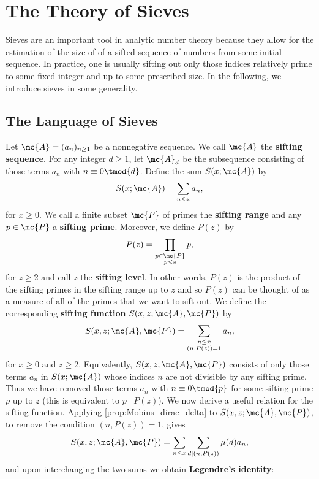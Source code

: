 \chapter{The Theory of Sieves}
  Sieves are an important tool in analytic number theory because they allow for the estimation of the size of of a sifted sequence of numbers from some initial sequence. In practice, one is usually sifting out only those indices relatively prime to some fixed integer and up to some prescribed size. In the following, we introduce sieves in some generality.
  \section{The Language of Sieves}
    Let $\mc{A} = (a_{n})_{n \ge 1}$ be a nonnegative sequence. We call $\mc{A}$ the \textbf{sifting sequence}. For any integer $d \ge 1$, let $\mc{A}_{d}$ be the subsequence consisting of those terms $a_{n}$ with $n \equiv 0 \tmod{d}$. Define the sum $S(x;\mc{A})$ by
    \[
      S(x;\mc{A}) = \sum_{\substack{n \le x}}a_{n},
    \]
    for $x \ge 0$. We call a finite subset $\mc{P}$ of primes the \textbf{sifting range} and any $p \in \mc{P}$ a \textbf{sifting prime}. Moreover, we define $P(z)$ by
    \[
      P(z) = \prod_{\substack{p \in \mc{P} \\ p < z}}p,
    \]
    for $z \ge 2$ and call $z$ the \textbf{sifting level}. In other words, $P(z)$ is the product of the sifting primes in the sifting range up to $z$ and so $P(z)$ can be thought of as a measure of all of the primes that we want to sift out. We define the corresponding \textbf{sifting function} $S(x,z;\mc{A},\mc{P})$ by
    \[
      S(x,z;\mc{A},\mc{P}) = \sum_{\substack{n \le x \\ (n,P(z)) = 1}}a_{n},
    \]
    for $x \ge 0$ and $z \ge 2$. Equivalently, $S(x,z;\mc{A},\mc{P})$ consists of only those terms $a_{n}$ in $S(x;\mc{A})$ whose indices $n$ are not divisible by any sifting prime. Thus we have removed those terms $a_{n}$ with $n \equiv 0 \tmod{p}$ for some sifting prime $p$ up to $z$ (this is equivalent to $p \mid P(z)$). We now derive a useful relation for the sifting function. Applying \cref{prop:Mobius_dirac_delta} to $S(x,z;\mc{A},\mc{P})$, to remove the condition $(n,P(z)) = 1$, gives
    \[
      S(x,z;\mc{A},\mc{P}) = \sum_{n \le x}\sum_{d \mid (n,P(z))}\mu(d)a_{n},
    \]
    and upon interchanging the two sums we obtain \textbf{Legendre's identity}:
